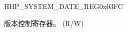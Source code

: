 \begin{register}{H}{HP\_SYSTEM\_DATE\_REG}{0x03FC}\label{regdesc:HPSYSTEMDATEREG}
%
%
\regnewline%
\begin{regdesc}\begin{reglist}
\label{fielddesc:HPSYSTEMDATE}\item [HP\_SYSTEM\_DATE] 版本控制寄存器。 (R/W)
\end{reglist}\end{regdesc}
\end{register}
